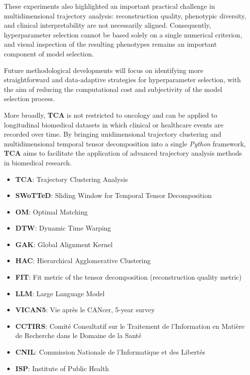 \documentclass[pdflatex,sn-mathphys-num,referee,lineno]{sn-jnl}
\newcommand{\proglang}[1]{\textit{#1}}
\newcommand{\pkg}[1]{\textbf{#1}}
\begin{document}
These experiments also highlighted an important practical challenge in multidimensional trajectory analysis: reconstruction quality, phenotypic diversity, and clinical interpretability are not necessarily aligned. 
Consequently, hyperparameter selection cannot be based solely on a single numerical criterion, and visual inspection of the resulting phenotypes remains an important component of model selection.

Future methodological developments will focus on identifying more straightforward and data-adaptive strategies for hyperparameter selection, with the aim of reducing the computational cost and subjectivity of the model selection process.

More broadly, \pkg{TCA} is not restricted to oncology and can be applied to longitudinal biomedical datasets in which clinical or healthcare events are recorded over time. 
By bringing unidimensional trajectory clustering and multidimensional temporal tensor decomposition into a single \proglang{Python} framework, \pkg{TCA} aims to facilitate the application of advanced trajectory analysis methods in biomedical research.

\backmatter

\begin{itemize}
  \item \textbf{TCA}: Trajectory Clustering Analysis
  \item \textbf{SWoTTeD}: Sliding Window for Temporal Tensor Decomposition
  \item \textbf{OM}: Optimal Matching
  \item \textbf{DTW}: Dynamic Time Warping
  \item \textbf{GAK}: Global Alignment Kernel
  \item \textbf{HAC}: Hierarchical Agglomerative Clustering
  \item \textbf{FIT}: Fit metric of the tensor decomposition (reconstruction quality metric)
  \item \textbf{LLM}: Large Language Model
  \item \textbf{VICAN5}: Vie après le CANcer, 5-year survey
  \item \textbf{CCTIRS}: Comité Consultatif sur le Traitement de l'Information en Matière de Recherche dans le Domaine de la Santé
  \item \textbf{CNIL}: Commission Nationale de l'Informatique et des Libertés
  \item \textbf{ISP}: Institute of Public Health
\end{itemize}
\end{document}
